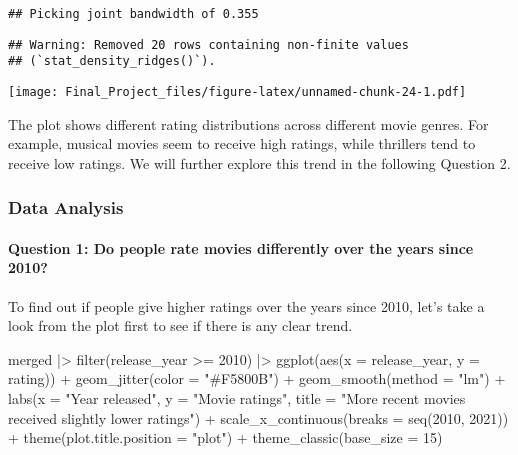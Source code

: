 \documentclass[
]{article}
\newenvironment{Shaded}{\begin{snugshade}}{\end{snugshade}}
\newcommand{\AttributeTok}[1]{\textcolor[rgb]{0.77,0.63,0.00}{#1}}
\newcommand{\DecValTok}[1]{\textcolor[rgb]{0.00,0.00,0.81}{#1}}
\newcommand{\FunctionTok}[1]{\textcolor[rgb]{0.00,0.00,0.00}{#1}}
\newcommand{\NormalTok}[1]{#1}
\newcommand{\SpecialCharTok}[1]{\textcolor[rgb]{0.00,0.00,0.00}{#1}}
\newcommand{\StringTok}[1]{\textcolor[rgb]{0.31,0.60,0.02}{#1}}
\begin{document}
\begin{verbatim}
## Picking joint bandwidth of 0.355
\end{verbatim}

\begin{verbatim}
## Warning: Removed 20 rows containing non-finite values
## (`stat_density_ridges()`).
\end{verbatim}

\texttt{[image: Final\_Project\_files/figure-latex/unnamed-chunk-24-1.pdf]}

The plot shows different rating distributions across different movie
genres. For example, musical movies seem to receive high ratings, while
thrillers tend to receive low ratings. We will further explore this
trend in the following Question 2.

\hypertarget{data-analysis}{%
\subsubsection{Data Analysis}\label{data-analysis}}

\hypertarget{question-1-do-people-rate-movies-differently-over-the-years-since-2010}{%
\paragraph{Question 1: Do people rate movies differently over the years
since
2010?}\label{question-1-do-people-rate-movies-differently-over-the-years-since-2010}}

To find out if people give higher ratings over the years since 2010,
let's take a look from the plot first to see if there is any clear
trend.

\begin{Shaded}
\begin{Highlighting}[]
\NormalTok{merged }\SpecialCharTok{|\textgreater{}}
  \FunctionTok{filter}\NormalTok{(release\_year }\SpecialCharTok{\textgreater{}=} \DecValTok{2010}\NormalTok{) }\SpecialCharTok{|\textgreater{}}
  \FunctionTok{ggplot}\NormalTok{(}\FunctionTok{aes}\NormalTok{(}\AttributeTok{x =}\NormalTok{ release\_year, }\AttributeTok{y =}\NormalTok{ rating)) }\SpecialCharTok{+}
  \FunctionTok{geom\_jitter}\NormalTok{(}\AttributeTok{color =} \StringTok{"\#F5800B"}\NormalTok{) }\SpecialCharTok{+}
  \FunctionTok{geom\_smooth}\NormalTok{(}\AttributeTok{method =} \StringTok{"lm"}\NormalTok{) }\SpecialCharTok{+}
  \FunctionTok{labs}\NormalTok{(}\AttributeTok{x =} \StringTok{"Year released"}\NormalTok{,}
       \AttributeTok{y =} \StringTok{"Movie ratings"}\NormalTok{,}
       \AttributeTok{title =} \StringTok{"More recent movies received slightly lower ratings"}\NormalTok{) }\SpecialCharTok{+}
  \FunctionTok{scale\_x\_continuous}\NormalTok{(}\AttributeTok{breaks =} \FunctionTok{seq}\NormalTok{(}\DecValTok{2010}\NormalTok{, }\DecValTok{2021}\NormalTok{)) }\SpecialCharTok{+}
  \FunctionTok{theme}\NormalTok{(}\AttributeTok{plot.title.position =} \StringTok{"plot"}\NormalTok{) }\SpecialCharTok{+}
  \FunctionTok{theme\_classic}\NormalTok{(}\AttributeTok{base\_size =} \DecValTok{15}\NormalTok{)}
\end{Highlighting}
\end{Shaded}
\end{document}
